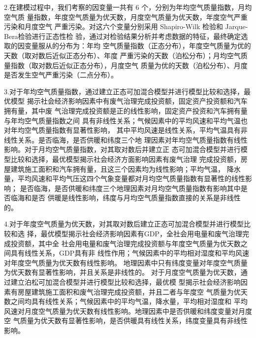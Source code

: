 \begin{cabstract}
  2.在建模过程中，我们考察的因变量一共有 6 个，分别为年均空气质量指数，月均空气质
  量指数，年度空气质量为优天数，月度空气质量为优天数，年度空气严重污染和月度空气
  严重污染。对这六个变量分别采用 Shapiro-Wilk 检验和 Jarque- Bera检验进行正态性检
  验，通过对检验结果分析并考虑数据的特征，最终确定选取的因变量服从的分布为：年均
  空气质量指数（正态分布），年度空气质量为优的天数（取对数后近似正态分布）、年度
  严重污染的天数（泊松分布）；月均空气质量指数（取对数后近似正态分布），月度空气
  质量为优的天数（泊松分布）、月度是否发生空气严重污染（二点分布）。
  
  3.对于年均空气质量指数，通过建立正态可加混合模型并进行模型比较和选择，最优模型
  揭示社会经济影响因素中有废气治理完成投资额，固定资产投资额和汽车拥有量，其中废
  气治理完成投资额是正的线性影响，固定资产投资和汽车拥有量与年均空气质量指数之间
  具有非线性关系；气候因素中的平均风速和平均气温也对年均空气质量指数有显著性影响，
  其中平均风速是线性关系，平均气温具有非线性关系。是否临海，是否供暖和纬度三个地
  理因素对年均空气质量指数有线性影响。对于月均空气质量指数，对其取对数后并建立正
  态可加混合模型并进行模型比较和选择，最优模型揭示社会经济方面影响因素有废气治理
  完成投资额，房屋建筑施工面积和汽车拥有量，且这三个因素均为线性影响；平均气温，
  降水量，平均风速和平均气压这四个气象变量都对月均空气质量指数有显著性的线性影响；
  是否临海，是否供暖和纬度三个地理因素对月均空气质量指数有影响其中是否临海和是否
  供暖是线性影响，纬度与月均空气质量指数直接的关系是非线性的。
  
  4.对于年度空气质量为优天数，对其取对数后建立正态可加混合模型并进行模型比较和选
  择，最优模型揭示社会经济影响因素有GDP，全社会用电量和废气治理完成投资额，其中全
  社会用电量和废气治理完成投资额与年度空气质量为优天数之间具有线性关系，GDP具有非
  线性作用；气候因素中的平均相对湿度和平均风速对年度空气质量为优天数有线性影响。
  地理因素中只有纬度变量对年度空气质量为优天数有显著性影响，并且关系是非线性的。
  对于月度空气质量为优天数，通过建立泊松可加混合模型并进行模型比较和选择，最优模
  型揭示社会经济影响因素有房屋建筑施工面积和废气治理完成投资额，并且二者与年度空
  气质量为优天数之间均具有线性关系；气候因素中的平均气温，降水量，平均相对湿度和
  平均风速对月度空气质量为优天数有线性影响。地理因素中是否供暖和纬度变量对月度空
  气质量为优天数有显著性影响，是否供暖具有线性关系，纬度变量具有非线性影响。
  

\end{cabstract}
